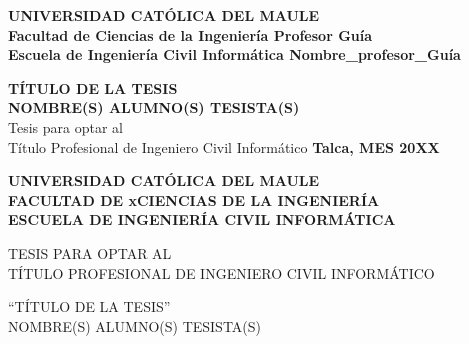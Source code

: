 \documentclass[headings=optiontohead,12pt,letterpaper,oneside,spanish]{book}
\begin{document}
\renewcommand{\listtablename}{'Indice de tablas}
\renewcommand{\tablename}{Tabla}

\thispagestyle{empty}

\textbf{
\small{
\hspace{-0.2cm}UNIVERSIDAD CATÓLICA DEL MAULE  \\
Facultad de Ciencias de la Ingeniería  \hfill  Profesor Guía\hspace{-0.1cm}\\
Escuela de Ingeniería Civil Informática \hfill  Nombre\_profesor\_Guía\\
}
}
\vspace{5cm}
\begin{center}
		{\bf {\normalsize TÍTULO DE LA TESIS}}\\
\vspace{1cm}
        {\bf {\normalsize NOMBRE(S) ALUMNO(S) TESISTA(S)}}\\
\vspace{1cm}
        {\normalsize Tesis  para optar al}\\
        {\normalsize Título Profesional de Ingeniero Civil Informático}
\vfill
\textbf{Talca, MES 20XX}
\end{center}

\newpage

\thispagestyle{empty}

\begin{center}
\textbf{
    UNIVERSIDAD CATÓLICA DEL MAULE\\
    FACULTAD DE xCIENCIAS DE LA INGENIERÍA\\
    ESCUELA DE INGENIERÍA CIVIL INFORMÁTICA\\
}
\vspace{1.5cm}

TESIS PARA OPTAR AL\\
TÍTULO PROFESIONAL DE INGENIERO CIVIL INFORMÁTICO\\

\vspace{1.2cm}

``TÍTULO DE LA TESIS''\\
NOMBRE(S) ALUMNO(S) TESISTA(S)\\

\end{center}

\vspace{0.5cm}
\end{document}
